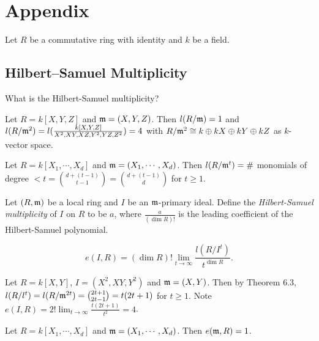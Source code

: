 \chapter{Appendix}

Let $R$ be a commutative ring with identity and $k$ be a field. 

\section*{Hilbert–Samuel Multiplicity}

\begin{question}
    What is the Hilbert-Samuel multiplicity? 
\end{question}

\begin{example}
    Let $R = k[X,Y,Z]$ and $\mathfrak{m} = (X,Y,Z)$. Then $l(R/\mathfrak{m}) = 1$ and $l(R/\mathfrak{m}^{2}) = l(\frac{k[X,Y,Z]}{X^{2},XY,XZ,Y^{2},YZ,Z^{2}}) = 4$ with $R/\mathfrak{m}^{2} \cong k \oplus kX \oplus kY \oplus kZ$ as $k$-vector space.
\end{example}

\begin{theorem}
    Let $R = k[X_1,\cdots,X_d]$ and $\mathfrak{m} = (X_1,\cdots,X_d)$. Then $l(R/\mathfrak{m}^{t}) = \#$ monomials of degree  $< t = \binom {d + (t-1)}{t-1} = \binom {d+(t-1)}{d}$ for $t \geq 1$.
\end{theorem}

\begin{definition}
    Let $(R,\mathfrak{m})$ be a local ring and $I$ be an $\mathfrak{m}$-primary ideal. Define the \emph{Hilbert-Samuel multiplicity} of $I$ on $R$ to be $a$, where $\frac{a}{(\dim R)!}$ is the leading coefficient of the Hilbert-Samuel polynomial.
\end{definition}

\begin{definition}
    \[e(I,R) = (\dim R)! \lim_{t \to \infty} \frac{l(R/I^{t})}{t^{\dim R}}.\]
\end{definition}

\begin{example}
    Let $R = k[X,Y]$, $I = (X^{2},XY,Y^{2})$ and $\mathfrak{m} = (X,Y)$. Then by Theorem 6.3, $l(R/l^{t}) = l(R/\mathfrak{m}^{2t}) = \binom {2t+1}{2t-1} = t(2t+1)$ for $t \geq 1$. Note $e(I,R) = 2! \lim_{t \to \infty} \frac{t(2t+1)}{t^{2}} = 4$.
\end{example}

\begin{fact}
    Let $R = k[X_1,\cdots,X_d]$ and $\mathfrak{m} = (X_1,\cdots,X_d)$. Then $e(\mathfrak{m},R) = 1$.
\end{fact}

